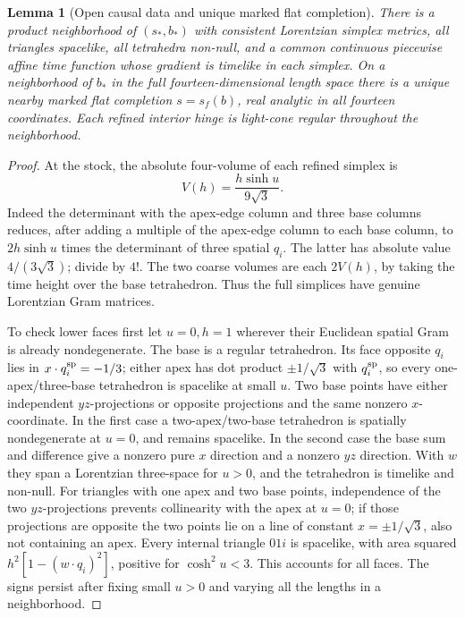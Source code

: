 \documentclass[11pt]{article}
\newtheorem{lemma}[theorem]{Lemma}
\begin{document}
\begin{lemma}[Open causal data and unique marked flat completion]\label{lem:chamber}
There is a product neighborhood of \((s_*,b_*)\) with consistent Lorentzian simplex metrics, all triangles spacelike, all tetrahedra non-null, and a common continuous piecewise affine time function whose gradient is timelike in each simplex. On a neighborhood of \(b_*\) in the full fourteen-dimensional length space there is a unique nearby marked flat completion \(s=s_f(b)\), real analytic in all fourteen coordinates. Each refined interior hinge is light-cone regular throughout the neighborhood.
\end{lemma}
\begin{proof}
At the stock, the absolute four-volume of each refined simplex is
\begin{equation}\label{eq:V}
 V(h)=\frac{h\sinh u}{9\sqrt3}.
\end{equation}
Indeed the determinant with the apex-edge column and three base columns reduces, after adding a multiple of the apex-edge column to each base column, to \(2h\sinh u\) times the determinant of three spatial \(q_i\). The latter has absolute value \(4/(3\sqrt3)\); divide by \(4!\). The two coarse volumes are each \(2V(h)\), by taking the time height over the base tetrahedron. Thus the full simplices have genuine Lorentzian Gram matrices.

To check lower faces first let \(u=0,h=1\) wherever their Euclidean spatial Gram is already nondegenerate. The base is a regular tetrahedron. Its face opposite \(q_i\) lies in \(x\cdot q_i^{\rm sp}=-1/3\); either apex has dot product \(\pm1/\sqrt3\) with \(q_i^{\rm sp}\), so every one-apex/three-base tetrahedron is spacelike at small \(u\). Two base points have either independent \(yz\)-projections or opposite projections and the same nonzero \(x\)-coordinate. In the first case a two-apex/two-base tetrahedron is spatially nondegenerate at \(u=0\), and remains spacelike. In the second case the base sum and difference give a nonzero pure \(x\) direction and a nonzero \(yz\) direction. With \(w\) they span a Lorentzian three-space for \(u>0\), and the tetrahedron is timelike and non-null. For triangles with one apex and two base points, independence of the two \(yz\)-projections prevents collinearity with the apex at \(u=0\); if those projections are opposite the two points lie on a line of constant \(x=\pm1/\sqrt3\), also not containing an apex. Every internal triangle \(01i\) is spacelike, with area squared \(h^2[1-(w\cdot q_i)^2]\), positive for \(\cosh^2 u<3\). This accounts for all faces. The signs persist after fixing small \(u>0\) and varying all the lengths in a neighborhood.


\end{proof}
\end{document}
